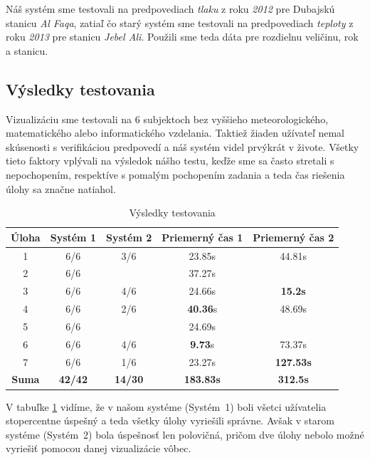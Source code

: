 Náš systém sme testovali na predpovediach \textit{tlaku} z roku \textit{2012} pre Dubajskú stanicu \textit{Al Faqa}, zatiaľ čo starý systém sme testovali na predpovediach \textit{teploty} z roku \textit{2013} pre stanicu \textit{Jebel Ali}. Použili sme teda dáta pre rozdielnu veličinu, rok a stanicu.

\subsection{Výsledky testovania}

Vizualizáciu sme testovali na 6 subjektoch bez vyššieho meteorologického, matematického alebo informatického vzdelania. Taktiež žiaden užívateľ nemal skúsenosti s verifikáciou predpovedí a náš systém videl prvýkrát v živote. Všetky tieto faktory vplývali na výsledok nášho testu, keďže sme sa často stretali s nepochopením, respektíve s pomalým pochopením zadania a teda čas riešenia úlohy sa značne natiahol.

\begin{table}[h]
	\centering
	\caption{Výsledky testovania}
	\label{table:results}
	\begin{tabular}{|c|c|c|c|c|}
		\hline
		\rowcolor[HTML]{9B9B9B} \textbf{Úloha} & \textbf{Systém 1} & \textbf{Systém 2} & \textbf{Priemerný čas 1} & \textbf{Priemerný čas 2} \\ \hline
		1  &  6/6   &  3/6 	 &  23.85s 		    &  44.81s   \\ \hline
		2  &  6/6   &\textemdash&  37.27s 		    &  \textemdash   \\ \hline
		3  &  6/6   &  4/6   &  24.66s 		    &  \textbf{15.2s}   \\ \hline
		4  &  6/6   &  2/6   &  \textbf{40.36}s &  48.69s   \\ \hline
		5  &  6/6   &\textemdash&  24.69s          &   \textemdash   \\ \hline
		6  &  6/6   &  4/6   &  \textbf{9.73}s  &  73.37s   \\ \hline
		7  &  6/6   &  1/6   &  23.27s          &  \textbf{127.53s}   \\ \hline
		\rowcolor[HTML]{C0C0C0} \textbf{Suma}  & \textbf{42/42} & \textbf{14/30} & \textbf{183.83s} & \textbf{312.5s}\\ \hline
	\end{tabular}
\end{table}

\pagebreak

V tabuľke \ref{table:results} vidíme, že v našom systéme \mbox{(Systém 1)} boli všetci užívatelia stopercentne úspešný a teda všetky úlohy vyriešili správne. Avšak v starom systéme \mbox{(Systém 2)} bola úspešnosť len polovičná, pričom dve úlohy nebolo možné vyriešiť pomocou danej vizualizácie vôbec.

